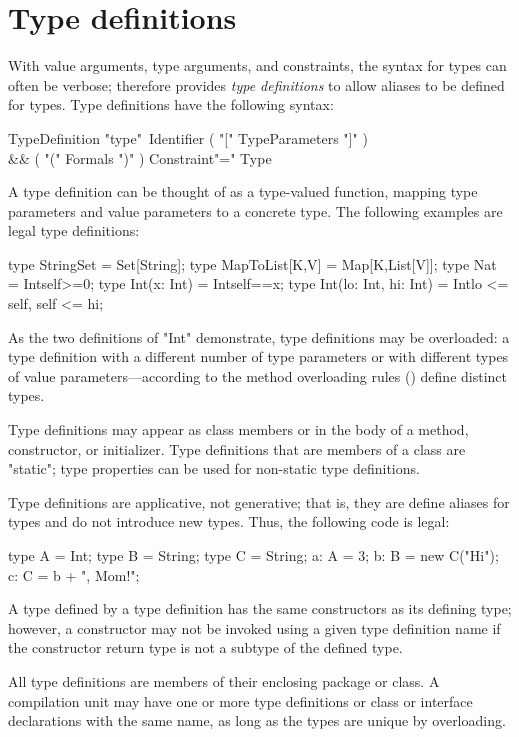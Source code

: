 
\section{Type definitions}

With value arguments, type arguments, and constraints, the
syntax for \Xten{} types can often be verbose;
\Xten{} therefore provides {\em type definitions}
to allow aliases to be defined for types.
Type definitions have the following syntax:

\begin{grammar}
TypeDefinition \: 
                \xcd"type"~Identifier
                           ( \xcd"[" TypeParameters \xcd"]" )\opt \\
                        && ( \xcd"(" Formals \xcd")" )\opt
                            Constraint\opt \xcd"=" Type \\
\end{grammar}

\noindent
A type definition can be thought of as a type-valued function,
mapping type parameters and value parameters to a concrete type.
%
The following examples are legal type definitions:
\begin{xten}
type StringSet = Set[String];
type MapToList[K,V] = Map[K,List[V]];
type Nat = Int{self>=0};
type Int(x: Int) = Int{self==x};
type Int(lo: Int, hi: Int) = Int{lo <= self, self <= hi};
\end{xten}

As the two definitions of \xcd"Int" demonstrate, type definitions may 
be overloaded: a type definition with a different number of type
parameters or with different types of value
parameters---according to the method overloading rules
() define distinct types.

Type definitions may appear as class members or in the body of a
method, constructor, or initializer.  Type definitions that are
members of a class are \xcd"static"; type properties can be used
for non-static type definitions.

Type definitions are applicative, not generative; that is, they
are define aliases for types and do not introduce new types.
Thus, the following code is legal:
\begin{xten}
type A = Int;
type B = String;
type C = String;
a: A = 3;
b: B = new C("Hi");
c: C = b + ", Mom!";
\end{xten}
A type defined by a type definition
has the same constructors as its defining type; however, a
constructor may not be invoked using a given type definition
name if the constructor return type is not a subtype of the
defined type.

All type definitions are members of their enclosing package or
class.  A compilation unit may have one or more type definitions
or class or interface declarations with the same name, as long
as the types are unique by overloading.

